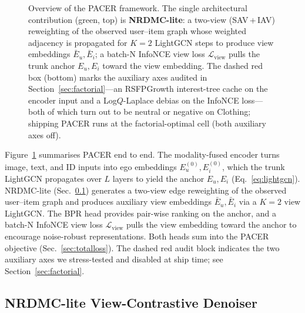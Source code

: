 \documentclass[conference]{IEEEtran}
\newcommand{\Lcal}{\mathcal{L}}
\begin{document}
\begin{figure}[t]
{%
}
\caption{Overview of the PACER framework. The single architectural
contribution (green, top) is \textbf{NRDMC-lite}: a two-view
(SAV\,+\,IAV) reweighting of the observed user--item graph whose
weighted adjacency is propagated for $K{=}2$ LightGCN steps to produce
view embeddings $\bar E_u, \bar E_i$; a batch-N InfoNCE view loss
$\Lcal_{\text{view}}$ pulls the trunk anchor $E_u, E_i$ toward the
view embedding. The dashed red box (bottom) marks the auxiliary axes
audited in Section~\ref{sec:factorial}---an RSFPGrowth interest-tree
cache on the encoder input and a Log$Q$-Laplace debias on the InfoNCE
loss---both of which turn out to be neutral or negative on Clothing;
shipping PACER runs at the factorial-optimal cell (both auxiliary
axes off).}
\label{fig:overall}
\end{figure}

Figure~\ref{fig:overall} summarises PACER end to end. The
modality-fused encoder turns image, text, and ID inputs into ego
embeddings $E^{(0)}_u, E^{(0)}_i$, which the trunk LightGCN propagates
over $L$ layers to yield the anchor $E_u, E_i$ (Eq.~\ref{eq:lightgcn}).
NRDMC-lite (Sec.~\ref{sec:nrdmc}) generates a two-view edge
reweighting of the observed user--item graph and produces auxiliary
view embeddings $\bar E_u, \bar E_i$ via a $K{=}2$ view LightGCN. The
BPR head provides pair-wise ranking on the anchor, and a batch-N
InfoNCE view loss $\Lcal_{\text{view}}$ pulls the view embedding
toward the anchor to encourage noise-robust representations. Both
heads sum into the PACER objective (Sec.~\ref{sec:totalloss}). The
dashed red audit block indicates the two auxiliary axes we
stress-tested and disabled at ship time; see Section~\ref{sec:factorial}.

\subsection{NRDMC-lite View-Contrastive Denoiser}
\label{sec:nrdmc}
\end{document}
